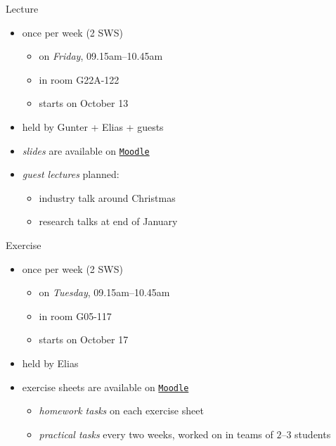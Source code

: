 \begin{frame}{\myframetitle}
	\begin{mycolumns}
		\begin{definition}{Lecture}
			\begin{itemize}
				\item once per week (2 SWS)
				\begin{itemize}
					\item on \emph{Friday}, 09.15am--10.45am
					\item in room G22A-122
					\item starts on October 13
				\end{itemize}
				\item held by Gunter + Elias + guests
				\item \emph{slides} are available on \texttt{\href{https://elearning.ovgu.de/course/view.php?id=15521}{Moodle}}
				\item \emph{guest lectures} planned:
				\begin{itemize}
					\item industry talk around Christmas
					\item research talks at end of January
				\end{itemize}
			\end{itemize}
		\end{definition}
	\mynextcolumn
		\begin{example}{Exercise}
			\begin{itemize}
				\item once per week (2 SWS)
				\begin{itemize}
					\item on \emph{Tuesday}, 09.15am--10.45am
					\item in room G05-117
					\item starts on October 17
				\end{itemize}
				\item held by Elias
				\item exercise sheets are available on \texttt{\href{https://elearning.ovgu.de/course/view.php?id=15521}{Moodle}}
				\begin{itemize}
					\item \emph{homework tasks} on each exercise sheet
					\item \emph{practical tasks} every two weeks, worked on in teams of $2$--$3$ students
				\end{itemize}
			\end{itemize}
		\end{example}
	\end{mycolumns}
\end{frame}

